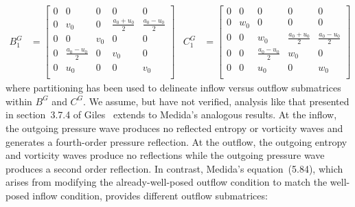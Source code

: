 \documentclass[letterpaper,11pt,nointlimits,reqno,draft]{amsart}
\begin{document}
\begin{align}
\label{eq:dimeulerapproxmedidaopt1}
  B^G_1 &= \left[\begin{array}{ccccc}
    0 & 0                 & 0   & 0                   & 0                 \\
    0 & v_0               & 0   & \frac{a_0 + u_0}{2} & \frac{a_0-u_0}{2} \\
    0 & 0                 & v_0 & 0                   & 0                 \\
    0 & \frac{a_0-u_0}{2} & 0   & v_0                 & 0                 \\ \hline
    0 & u_0               & 0   & 0                   & v_0               \\
  \end{array}\right]
&
  C^G_1 &= \left[\begin{array}{ccccc}
    0 & 0   & 0                 & 0                 & 0                 \\
    0 & w_0 & 0                 & 0                 & 0                 \\
    0 & 0   & w_0               & \frac{a_0+u_0}{2} & \frac{a_0-u_0}{2} \\
    0 & 0   & \frac{a_0-u_0}{2} & w_0               & 0                 \\ \hline
    0 & 0   & u_0               & 0                 & w_0               \\
  \end{array}\right]
\end{align}
where partitioning has been used to delineate inflow versus outflow submatrices
within $B^G$ and $C^G$.  We assume, but have not verified, analysis like that
presented in section~3.7.4 of Giles~\cite{Giles1988Nonreflecting} extends to
Medida's analogous results.  At the inflow, the outgoing pressure wave produces
no reflected entropy or vorticity waves and generates a fourth-order pressure
reflection.  At the outflow, the outgoing entropy and vorticity waves produce
no reflections while the outgoing pressure wave produces a second order
reflection.  In contrast, Medida's equation~(5.84), which arises from modifying
the already-well-posed outflow condition to match the well-posed inflow
condition, provides different outflow submatrices:
\end{document}
